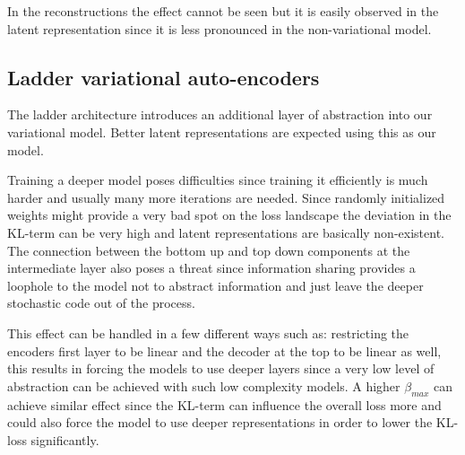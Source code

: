 \documentclass[12pt, english]{article}
\begin{document}
\vspace{4mm}

\par In the reconstructions the effect cannot be seen but it is easily observed in the latent representation since it is less pronounced in the non-variational model.

\vspace{4mm}

\newpage

\subsection{Ladder variational auto-encoders}

\vspace{5mm}

\par The ladder architecture introduces an additional layer of abstraction into our variational model. Better latent representations are expected using this as our model.

\vspace{4mm}

\par Training a deeper model poses difficulties since training it efficiently is much harder and usually many more iterations are needed. Since randomly initialized weights might provide a very bad spot on the loss landscape the deviation in the KL-term can be very high and latent representations are basically non-existent. The connection between the bottom up and top down components at the intermediate layer also poses a threat since information sharing provides a loophole to the model not to abstract information and just leave the deeper stochastic code out of the process. 

\vspace{4mm}

\par This effect can be handled in a few different ways such as: restricting the encoders first layer to be linear and the decoder at the top to be linear as well, this results in forcing the models to use deeper layers since a very low level of abstraction can be achieved with such low complexity models. A higher $\beta_{max}$ can achieve similar effect since the KL-term can influence the overall loss more and could also force the model to use deeper representations in order to lower the KL-loss significantly. 

\vspace{4mm}
\end{document}
